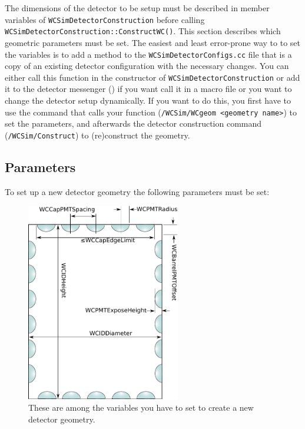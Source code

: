 The dimensions of the detector to be setup must be described in member variables of  \texttt{WCSimDetectorConstruction} before calling  \texttt{WCSimDetectorConstruction::ConstructWC()}. This section describes which geometric parameters must be set. The easiest and least error-prone way to to set the variables is to add a method to the \texttt{WCSimDetectorConfigs.cc} file that is a copy of an existing detector configuration with the necessary changes.
You can either call this function in the constructor of \texttt{WCSimDetectorConstruction} or add it to the detector messenger () if you want call it in a macro file or you want to change the detector setup dynamically. If you want to do this, you first have to use the command that calls your function (\texttt{/WCSim/WCgeom <geometry name>}) to set the parameters, and afterwards the detector construction command (\texttt{/WCSim/Construct}) to (re)construct the geometry.

\subsection{Parameters}\label{sec:param}
To set up a new detector geometry the following parameters must be set:

\begin{figure}
  \begin{center}
\includegraphics[width=0.60\textwidth]{variables}
  \end{center}
\caption{These are among the variables you have to set to create a new detector geometry.}\label{fig:geom}
\end{figure}


